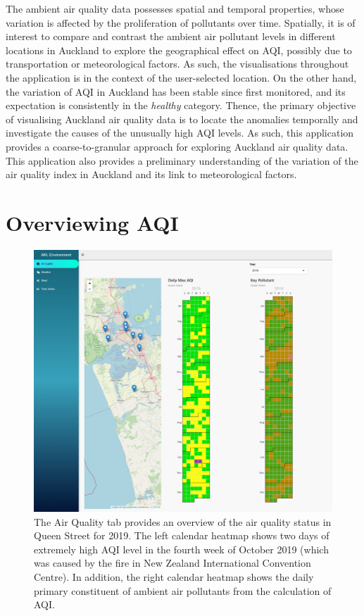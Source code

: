\documentclass{aucklandthesis}
\begin{document}
The ambient air quality data possesses spatial and temporal properties, whose variation is affected by the proliferation of pollutants over time. Spatially, it is of interest to compare and contrast the ambient air pollutant levels in different locations in Auckland to explore the geographical effect on AQI, possibly due to transportation or meteorological factors. As such, the visualisations throughout the application is in the context of the user-selected location. On the other hand, the variation of AQI in Auckland has been stable since first monitored, and its expectation is consistently in the \emph{healthy} category. Thence, the primary objective of visualising Auckland air quality data is to locate the anomalies temporally and investigate the causes of the unusually high AQI levels. As such, this application provides a coarse-to-granular approach for exploring Auckland air quality data. This application also provides a preliminary understanding of the variation of the air quality index in Auckland and its link to meteorological factors.

\hypertarget{overviewing-aqi}{%
\section{Overviewing AQI}\label{overviewing-aqi}}

\begin{figure}
\includegraphics[width=1\linewidth]{figures/aqi-tab} \caption{The Air Quality tab provides an overview of the air quality status in Queen Street for 2019. The left calendar heatmap shows two days of extremely high AQI level in the fourth week of October 2019 (which was caused by the fire in New Zealand International Convention Centre). In addition, the right calendar heatmap shows the daily primary constituent of ambient air pollutants from the calculation of AQI.}\label{fig:unnamed-chunk-1}
\end{figure}
\end{document}
